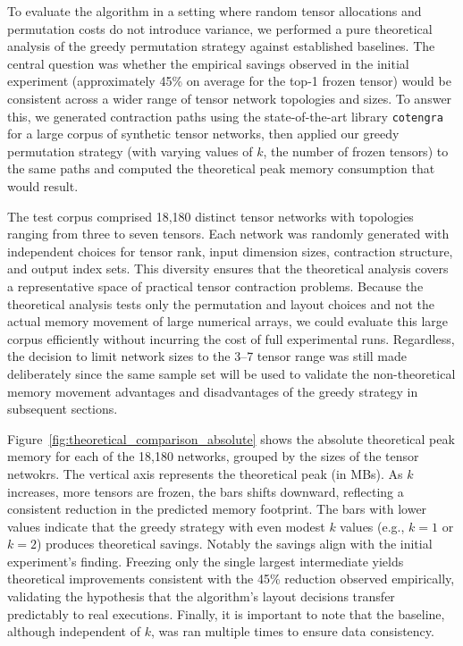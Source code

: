To evaluate the algorithm in a setting where random tensor allocations and permutation costs do not introduce variance, we performed a pure theoretical analysis of the greedy permutation strategy against established baselines. The central question was whether the empirical savings observed in the initial experiment (approximately 45\% on average for the top-1 frozen tensor) would be consistent across a wider range of tensor network topologies and sizes. To answer this, we generated contraction paths using the state-of-the-art library \texttt{cotengra} for a large corpus of synthetic tensor networks, then applied our greedy permutation strategy (with varying values of $k$, the number of frozen tensors) to the same paths and computed the theoretical peak memory consumption that would result.

The test corpus comprised 18,180 distinct tensor networks with topologies ranging from three to seven tensors. Each network was randomly generated with independent choices for tensor rank, input dimension sizes, contraction structure, and output index sets. This diversity ensures that the theoretical analysis covers a representative space of practical tensor contraction problems. Because the theoretical analysis tests only the permutation and layout choices and not the actual memory movement of large numerical arrays, we could evaluate this large corpus efficiently without incurring the cost of full experimental runs. Regardless, the decision to limit network sizes to the 3--7 tensor range was still made deliberately since the same sample set will be used to validate the non-theoretical memory movement advantages and disadvantages of the greedy strategy in subsequent sections.

Figure~\ref{fig:theoretical_comparison_absolute} shows the absolute theoretical peak memory for each of the 18,180 networks, grouped by the sizes of the tensor netwokrs. The vertical axis represents the theoretical peak (in MBs). As $k$ increases, more tensors are frozen, the bars shifts downward, reflecting a consistent reduction in the predicted memory footprint. The bars with lower values indicate that the greedy strategy with even modest $k$ values (e.g., $k=1$ or $k=2$) produces theoretical savings. Notably the savings align with the initial experiment's finding. Freezing only the single largest intermediate yields theoretical improvements consistent with the 45\% reduction observed empirically, validating the hypothesis that the algorithm's layout decisions transfer predictably to real executions. Finally, it is important to note that the baseline, although independent of $k$, was ran multiple times to ensure data consistency.

